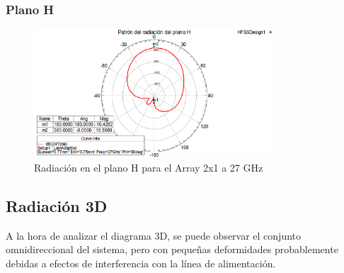 \subsubsection{Plano H}
\begin{figure}[H]
    \centering
        \includegraphics[width=0.8\textwidth]{archivos/analisis/2x13/5}
        \caption{Radiación en el plano H para el Array 2x1 a 27 GHz}
        \label{fig:H2x13}
\end{figure}

\newpage
\subsection{Radiación 3D}
\par A la hora de analizar el diagrama 3D, se puede observar el conjunto omnidireccional del sistema, pero con pequeñas deformidades probablemente debidas a efectos de interferencia con la línea de alimentación. 

